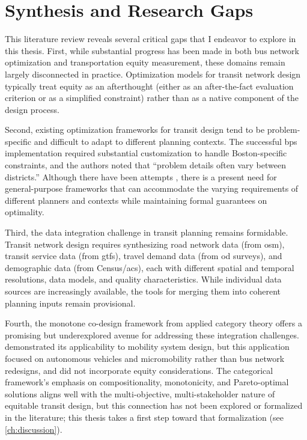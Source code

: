\section{Synthesis and Research Gaps}

This literature review reveals several critical gaps that I endeavor to explore in this thesis. First, while substantial progress has been made in both bus network optimization and transportation equity measurement, these domains remain largely disconnected in practice. Optimization models for transit network design typically treat equity as an afterthought (either as an after-the-fact evaluation criterion or as a simplified constraint) rather than as a native component of the design process.

Second, existing optimization frameworks for transit design tend to be problem-specific and difficult to adapt to different planning contexts. The successful \gls{bps} implementation required substantial customization to handle Boston-specific constraints, and the authors noted that ``problem details often vary between districts.'' Although there have been attempts \cite{AzaveaBusplan2026}, there is a present need for general-purpose frameworks that can accommodate the varying requirements of different planners and contexts while maintaining formal guarantees on optimality.

Third, the data integration challenge in transit planning remains formidable. Transit network design requires synthesizing road network data (from \gls{osm}), transit service data (from \gls{gtfs}), travel demand data (from \gls{od} surveys), and demographic data (from Census/\gls{acs}), each with different spatial and temporal resolutions, data models, and quality characteristics. While individual data sources are increasingly available, the tools for merging them into coherent planning inputs remain provisional.

Fourth, the monotone co-design framework from applied category theory offers a promising but underexplored avenue for addressing these integration challenges. \textcite{zardiniCoDesignEnableUserFriendly2023} demonstrated its applicability to mobility system design, but this application focused on autonomous vehicles and micromobility rather than bus network redesigns, and did not incorporate equity considerations. The categorical framework's emphasis on compositionality, monotonicity, and Pareto-optimal solutions aligns well with the multi-objective, multi-stakeholder nature of equitable transit design, but this connection has not been explored or formalized in the literature; this thesis takes a first step toward that formalization (see \autoref{ch:discussion}).


